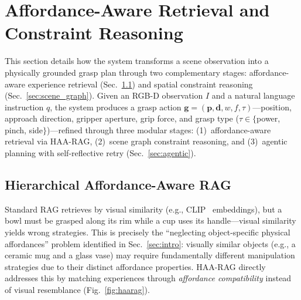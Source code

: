 \documentclass[letterpaper, 10pt, conference]{ieeeconf}
\newcommand{\haarag}{HAA-RAG}
\begin{document}
\section{Affordance-Aware Retrieval and\texorpdfstring{\\}{ }Constraint Reasoning}
\label{sec:retrieval}

This section details how the system transforms a scene observation into a physically grounded grasp plan through two complementary stages: affordance-aware experience retrieval (Sec.~\ref{sec:haarag}) and spatial constraint reasoning (Sec.~\ref{sec:scene_graph}).
Given an RGB-D observation $I$ and a natural language instruction $q$, the system produces a grasp action $\mathbf{g} = (\mathbf{p}, \mathbf{d}, w, f, \tau)$---position, approach direction, gripper aperture, grip force, and grasp type ($\tau \in \{$power, pinch, side$\}$)---refined through three modular stages: (1)~affordance-aware retrieval via \haarag{}, (2)~scene graph constraint reasoning, and (3)~agentic planning with self-reflective retry (Sec.~\ref{sec:agentic}).

\subsection{Hierarchical Affordance-Aware RAG}
\label{sec:haarag}

Standard RAG retrieves by visual similarity (e.g., CLIP~\cite{radford2021clip} embeddings), but a bowl must be grasped along its rim while a cup uses its handle---visual similarity yields wrong strategies.
This is precisely the ``neglecting object-specific physical affordances'' problem identified in Sec.~\ref{sec:intro}: visually similar objects (e.g., a ceramic mug and a glass vase) may require fundamentally different manipulation strategies due to their distinct affordance properties.
\haarag{} directly addresses this by matching experiences through \emph{affordance compatibility} instead of visual resemblance (Fig.~\ref{fig:haarag}).
\end{document}

